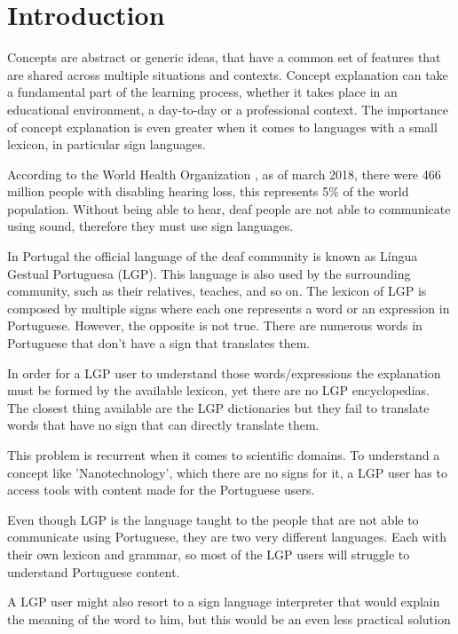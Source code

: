 \documentclass[runningheads]{llncs}
\begin{document}
\section{Introduction}

Concepts are abstract or generic ideas, that have a common set of features that are shared across multiple situations and contexts.
Concept explanation can take a fundamental part of the learning process, whether it takes place in an educational environment, a day-to-day or a professional context.
The importance of concept explanation is even greater when it comes to languages with a small lexicon, in particular sign languages.

According to the World Health Organization \cite{who_2020}, as of march 2018, there were 466 million people with disabling hearing loss, this represents 5\% of the world population.
Without being able to hear, deaf people are not able to communicate using sound, therefore they must use sign languages.

In Portugal the official language of the deaf community is known as Língua Gestual Portuguesa (LGP).
This language is also used by the surrounding community, such as their relatives, teaches, and so on.
The lexicon of LGP is composed by multiple signs where each one represents a word or an expression in Portuguese.
However, the opposite is not true.
There are numerous words in Portuguese that don't have a sign that translates them.

In order for a LGP user to understand those words/expressions the explanation must be formed by the available lexicon, yet there are no LGP encyclopedias.
The closest thing available are the LGP dictionaries but they fail to translate words that have no sign that can directly translate them.

This problem is recurrent when it comes to scientific domains.
To understand a concept like 'Nanotechnology', which there are no signs for it, a LGP user has to access tools with content made for the Portuguese users.

Even though LGP is the language taught to the people that are not able to communicate using Portuguese, they are two very different languages.
Each with their own lexicon and grammar, so most of the LGP users will struggle to understand Portuguese content.

A LGP user might also resort to a sign language interpreter that would explain the meaning of the word to him, but this would be an even less practical solution
\end{document}
